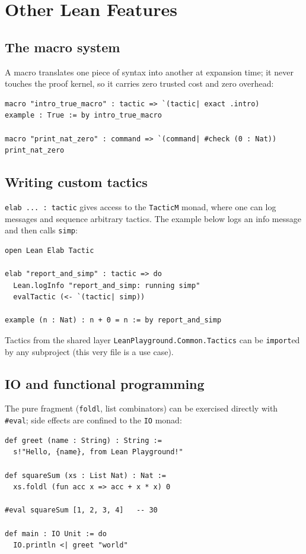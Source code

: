 \section{Other Lean Features}\label{sec:features}

\subsection{The macro system}
A macro translates one piece of syntax into another at expansion time; it
never touches the proof kernel, so it carries zero trusted cost and zero
overhead:

\begin{lstlisting}
macro "intro_true_macro" : tactic => `(tactic| exact .intro)
example : True := by intro_true_macro

macro "print_nat_zero" : command => `(command| #check (0 : Nat))
print_nat_zero
\end{lstlisting}

\subsection{Writing custom tactics}
\texttt{elab ... : tactic} gives access to the \texttt{TacticM} monad, where
one can log messages and sequence arbitrary tactics. The example below logs
an info message and then calls \texttt{simp}:

\begin{lstlisting}
open Lean Elab Tactic

elab "report_and_simp" : tactic => do
  Lean.logInfo "report_and_simp: running simp"
  evalTactic (<- `(tactic| simp))

example (n : Nat) : n + 0 = n := by report_and_simp
\end{lstlisting}

Tactics from the shared layer
\texttt{LeanPlayground.Common.Tactics} can be \texttt{import}ed by any
subproject (this very file is a use case).

\subsection{IO and functional programming}
The pure fragment (\texttt{foldl}, list combinators) can be exercised
directly with \texttt{\#eval}; side effects are confined to the \texttt{IO}
monad:

\begin{lstlisting}
def greet (name : String) : String :=
  s!"Hello, {name}, from Lean Playground!"

def squareSum (xs : List Nat) : Nat :=
  xs.foldl (fun acc x => acc + x * x) 0

#eval squareSum [1, 2, 3, 4]   -- 30

def main : IO Unit := do
  IO.println <| greet "world"
\end{lstlisting}
